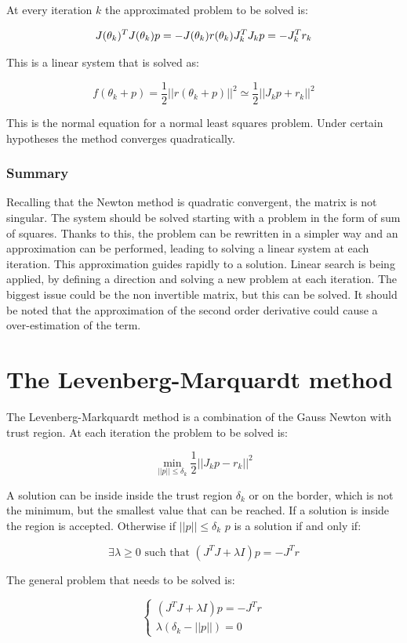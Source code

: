   At every iteration $k$ the approximated problem to be solved is:

  $$J(\theta_k)^TJ(\theta_k)p=-J(\theta_k)r(\theta_k) \\ J_k^TJ_kp=-J_k^T r_k$$

  This is a linear system that is solved as:

  $$f(\theta_k+p)= \frac{1}{2} ||r(\theta_k+p)||^2 \simeq \frac{1}{2} ||J_kp+r_k||^2$$

  This is the normal equation for a normal least squares problem.
  Under certain hypotheses the method converges quadratically.

    \subsubsection{Summary}
    Recalling that the Newton method is quadratic convergent, the matrix is not singular.
    The system should be solved starting with a problem in the form of sum of squares.
    Thanks to this, the problem can be rewritten in a simpler way and an approximation can be performed, leading to solving a linear system at each iteration.
    This approximation guides  rapidly to a solution.
    Linear search is being applied, by defining a direction and solving a new problem at each iteration.
    The biggest issue could be the non invertible matrix, but this can be solved.
    It should be noted that the approximation of the second order derivative could cause a over-estimation of the term.

\section{The Levenberg-Marquardt method}
The Levenberg-Markquardt method is a combination of the Gauss Newton with trust region.
At each iteration the problem to be solved is:

$$\min_{||p||\leq\delta_k} \frac{1}{2} ||J_kp-r_k||^2$$

A solution can be inside inside the trust region $\delta_k$ or on the border, which is not the minimum, but the smallest value that can be reached.
If a solution is inside the region is accepted.
Otherwise if $||p||\le\delta_k$ $p$ is a solution if and only if:

$$\exists\lambda \ge 0 \text{ such that } (J^TJ + \lambda I)p = -J^Tr$$

The general problem that needs to be solved is:

$$\begin{cases}(J^TJ + \lambda I)p = -J^Tr\\\lambda(\delta_k-||p||) = 0\end{cases}$$

